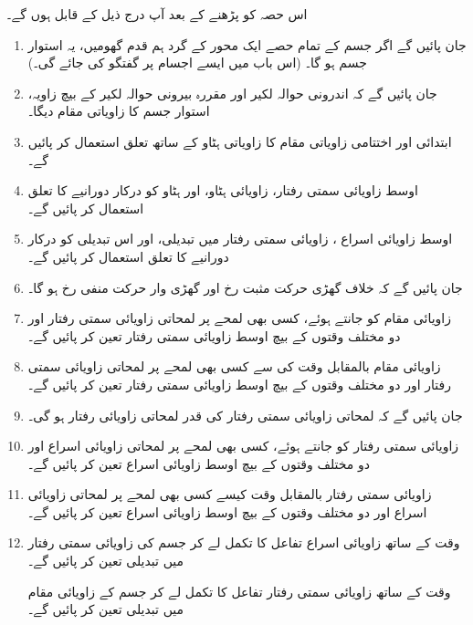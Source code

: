 اس حصہ کو پڑھنے کے بعد آپ درج ذیل کے قابل ہوں گے۔
\begin{enumerate}[1.]
\item
جان پائیں گے اگر جسم کے تمام حصے ایک  محور کے گرد  ہم قدم گھومیں، یہ   استوار  جسم ہو گا۔ (اس باب میں ایسے اجسام پر گفتگو کی جائے گی۔)
\item
جان پائیں گے کہ  اندرونی حوالہ لکیر اور مقررہ  بیرونی حوالہ لکیر  کے بیچ زاویہ،  استوار جسم کا زاویاتی مقام دیگا۔
\item
ابتدائی اور اختتامی زاویاتی مقام  کا زاویاتی ہٹاو کے ساتھ تعلق استعمال کر پائیں گے۔
\item
اوسط زاویائی سمتی رفتار،  زاویائی ہٹاو، اور ہٹاو کو درکار دورانیے کا  تعلق استعمال کر پائیں گے۔
\item
اوسط زاویائی  اسراع ،  زاویائی  سمتی رفتار میں تبدیلی، اور اس تبدیلی کو درکار دورانیے کا  تعلق استعمال کر پائیں گے۔
\item
جان پائیں گے کہ خلاف  گھڑی  حرکت مثبت  رخ اور گھڑی وار حرکت منفی  رخ ہو گا۔
\item
زاویائی مقام   کو جانتے ہوئے، کسی بھی لمحے پر لمحاتی زاویائی سمتی رفتار اور دو مختلف وقتوں کے بیچ اوسط زاویائی سمتی رفتار تعین کر  پائیں گے۔
\item
زاویائی مقام   بالمقابل   وقت   کی سے  کسی بھی لمحے پر لمحاتی زاویائی سمتی رفتار اور دو مختلف وقتوں کے بیچ اوسط زاویائی سمتی رفتار تعین کر  پائیں گے۔
\item
جان پائیں گے کہ لمحاتی زاویائی  سمتی رفتار  کی قدر لمحاتی زاویائی رفتار ہو گی۔
\item
زاویائی  سمتی رفتار    کو   جانتے ہوئے، کسی بھی لمحے پر لمحاتی زاویائی  اسراع اور دو مختلف وقتوں کے بیچ اوسط زاویائی  اسراع تعین کر  پائیں گے۔
\item
زاویائی سمتی رفتار    بالمقابل   وقت   کیسے  کسی بھی لمحے پر لمحاتی زاویائی اسراع اور دو مختلف وقتوں کے بیچ اوسط زاویائی اسراع تعین کر  پائیں گے۔
\item
وقت کے ساتھ زاویائی اسراع تفاعل کا تکمل  لے کر جسم کی زاویائی سمتی رفتار میں تبدیلی تعین کر پائیں گے۔

وقت کے ساتھ زاویائی  سمتی رفتار  تفاعل کا تکمل  لے کر جسم کے  زاویائی مقام میں تبدیلی تعین کر پائیں گے۔
\end{enumerate}

